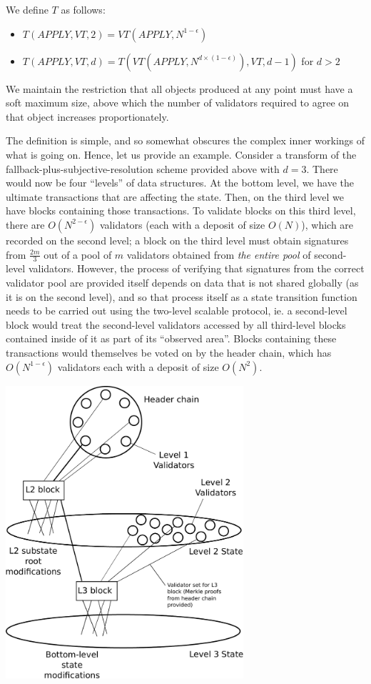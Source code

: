 \documentclass[11pt,a4paper]{report}
\theoremstyle{plain}
\theoremstyle{definition}
\theoremstyle{remark}
\begin{document}
We define $T$ as follows:

\begin{itemize}
\item
$T(APPLY, VT, 2) = VT(APPLY, N^{1-\epsilon})$
\item
$T(APPLY, VT, d) = T(VT(APPLY, N^{d\times (1-\epsilon)}), VT, d-1)$ for $d > 2$
\end{itemize}

We maintain the restriction that all objects produced at any point must have a soft maximum size, above which the number of validators required to agree on that object increases proportionately.

The definition is simple, and so somewhat obscures the complex inner workings of what is going on. Hence, let us provide an example. Consider a transform of the fallback-plus-subjective-resolution scheme provided above with $d = 3$. There would now be four ``levels'' of data structures. At the bottom level, we have the ultimate transactions that are affecting the state. Then, on the third level we have blocks containing those transactions. To validate blocks on this third level, there are $O(N^{2-\epsilon})$ validators (each with a deposit of size $O(N)$), which are recorded on the second level; a block on the third level must obtain signatures from $\frac{2m}{3}$ out of a pool of $m$ validators obtained from \emph{the entire pool} of second-level validators. However, the process of verifying that signatures from the correct validator pool are provided itself depends on data that is not shared globally (as it is on the second level), and so that process itself as a state transition function needs to be carried out using the two-level scalable protocol, ie. a second-level block would treat the second-level validators accessed by all third-level blocks contained inside of it as part of its ``observed area''. Blocks containing these transactions would themselves be voted on by the header chain, which has $O(N^{1-\epsilon})$ validators each with a deposit of size $O(N^2)$.

\begin{center}
\includegraphics[width=250pt]{figs/pdfs/multilevel.pdf}
\end{center}
\end{document}
